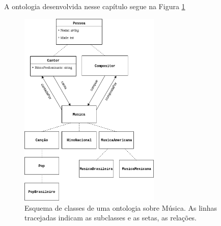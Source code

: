 A ontologia desenvolvida nesse capítulo segue na Figura \ref{img:Esquema}

\begin{figure}
	\centering
	\includegraphics[width=0.6\textwidth]{Capitulos/Ontologias/OntologiaMusica}
	\caption{Esquema de classes de uma ontologia sobre Música. As linhas tracejadas indicam as subclasses e as setas, as relações.}
	\label{img:Esquema}
\end{figure}